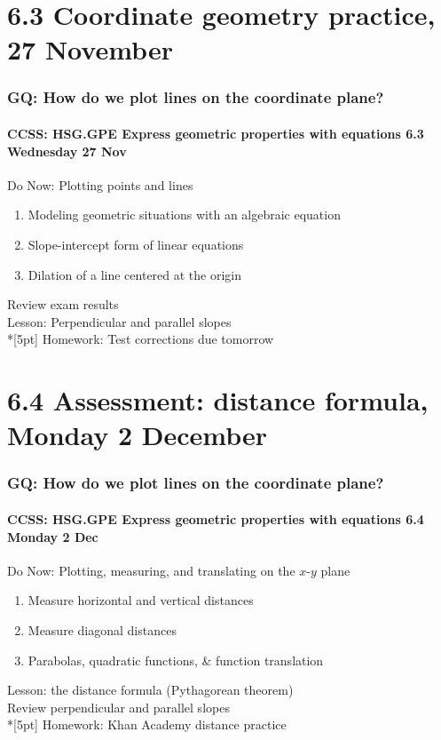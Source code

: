 \documentclass{beamer}
\begin{document}
\section{6.3 Coordinate geometry practice, 27 November}
  \frame
  {
    \frametitle{GQ: How do we plot lines on the coordinate plane?}
    \framesubtitle{CCSS: HSG.GPE Express geometric properties with equations \hfill \alert{6.3 Wednesday 27 Nov}}

    \begin{block}{Do Now: Plotting points and lines}
    \begin{enumerate}
      \item Modeling geometric situations with an algebraic equation
      \item Slope-intercept form of linear equations
      \item Dilation of a line centered at the origin
    \end{enumerate}
    \end{block}
    Review exam results \\
    Lesson: Perpendicular and parallel slopes \\*[5pt]
    Homework: Test corrections due \alert{tomorrow}
  }

  \section{6.4 Assessment: distance formula, Monday 2 December}
  \frame
  {
    \frametitle{GQ: How do we plot lines on the coordinate plane?}
    \framesubtitle{CCSS: HSG.GPE Express geometric properties with equations \hfill \alert{6.4 Monday 2 Dec}}

    \begin{block}{Do Now: Plotting, measuring, and translating on the $x$-$y$ plane}
    \begin{enumerate}
      \item Measure horizontal and vertical distances
      \item Measure diagonal distances
      \item Parabolas, quadratic functions, \& function translation
    \end{enumerate}
    \end{block}
    Lesson: the distance formula (Pythagorean theorem)\\
    Review perpendicular and parallel slopes  \\*[5pt]
    Homework: Khan Academy distance practice
  }
\end{document}
